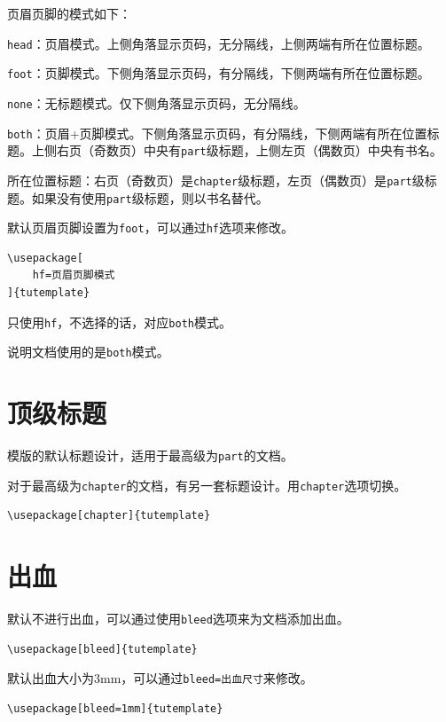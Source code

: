 \documentclass[10pt,openany]{book}
\begin{document}
页眉页脚的模式如下：

\verb|head|：页眉模式。上侧角落显示页码，无分隔线，上侧两端有所在位置标题。

\verb|foot|：页脚模式。下侧角落显示页码，有分隔线，下侧两端有所在位置标题。

\verb|none|：无标题模式。仅下侧角落显示页码，无分隔线。

\verb|both|：页眉+页脚模式。下侧角落显示页码，有分隔线，下侧两端有所在位置标题。上侧右页（奇数页）中央有\verb|part|级标题，上侧左页（偶数页）中央有书名。


所在位置标题：右页（奇数页）是\verb|chapter|级标题，左页（偶数页）是\verb|part|级标题。如果没有使用\verb|part|级标题，则以书名替代。

默认页眉页脚设置为\verb|foot|，可以通过\verb|hf|选项来修改。

\begin{verbatim}
\usepackage[
    hf=页眉页脚模式
]{tutemplate}
\end{verbatim}

只使用\verb|hf|，不选择的话，对应\verb|both|模式。

说明文档使用的是\verb|both|模式。

\section{顶级标题}

模版的默认标题设计，适用于最高级为\verb|part|的文档。

对于最高级为\verb|chapter|的文档，有另一套标题设计。用\verb|chapter|选项切换。

\begin{verbatim}
\usepackage[chapter]{tutemplate}
\end{verbatim}

\section{出血}

默认不进行出血，可以通过使用\verb|bleed|选项来为文档添加出血。

\begin{verbatim}
\usepackage[bleed]{tutemplate}
\end{verbatim}

默认出血大小为3mm，可以通过\verb|bleed=出血尺寸|来修改。

\begin{verbatim}
\usepackage[bleed=1mm]{tutemplate}
\end{verbatim}
\end{document}
